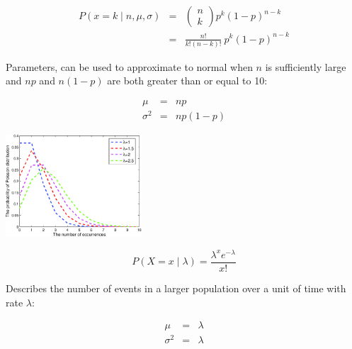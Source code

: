 \begin{eqnarray}
	P(x = k \mid n, \mu, \sigma) &=& \begin{pmatrix}
		n\\ 
		k
	\end{pmatrix}
	p^k (1 - p)^{n -k} \\
	&=& \frac{n!}{k!(n - k)!} ~p^k (1 - p)^{n - k} 
\end{eqnarray}

Parameters, can be used to approximate to normal when $n$ is sufficiently large and $np$ and $n(1-p)$ are both greater than or equal to 10:

\begin{eqnarray}
  \mu       &=& np \\
  \sigma^2  &=& np(1 - p)
\end{eqnarray}

\hformbar




\begin{center}
    \includegraphics[width=2in]{poisson}
\end{center}

\begin{equation}
	P(X = x \mid \lambda) = \frac{\lambda^x e^{-\lambda}}{x!}
\end{equation}

Describes the number of events in a larger population over a unit of time with rate $\lambda$:

\begin{eqnarray}
  \mu       &=& \lambda \\
  \sigma^2  &=& \lambda
\end{eqnarray}

\hformbar







%
%























